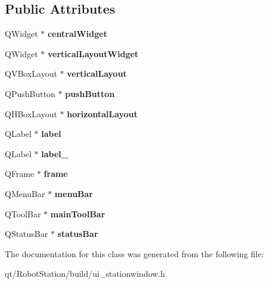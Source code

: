 \subsection*{Public Attributes}
\begin{DoxyCompactItemize}
\item 
\hypertarget{classUi__StationWindow_a29ad623f922ab7ede612f9dddab7a55c}{}Q\+Widget $\ast$ {\bfseries central\+Widget}\label{classUi__StationWindow_a29ad623f922ab7ede612f9dddab7a55c}

\item 
\hypertarget{classUi__StationWindow_a781611f8784156ed093f55133a25a8fe}{}Q\+Widget $\ast$ {\bfseries vertical\+Layout\+Widget}\label{classUi__StationWindow_a781611f8784156ed093f55133a25a8fe}

\item 
\hypertarget{classUi__StationWindow_a7993a098ec601f40393fcafd8cfa619e}{}Q\+V\+Box\+Layout $\ast$ {\bfseries vertical\+Layout}\label{classUi__StationWindow_a7993a098ec601f40393fcafd8cfa619e}

\item 
\hypertarget{classUi__StationWindow_ad015d1543bc1ca34a00d7a0972703fed}{}Q\+Push\+Button $\ast$ {\bfseries push\+Button}\label{classUi__StationWindow_ad015d1543bc1ca34a00d7a0972703fed}

\item 
\hypertarget{classUi__StationWindow_acd4d97d889710071df46b388cc41a59b}{}Q\+H\+Box\+Layout $\ast$ {\bfseries horizontal\+Layout}\label{classUi__StationWindow_acd4d97d889710071df46b388cc41a59b}

\item 
\hypertarget{classUi__StationWindow_a2c1e1c0a89df30ddceadcdbc336220e3}{}Q\+Label $\ast$ {\bfseries label}\label{classUi__StationWindow_a2c1e1c0a89df30ddceadcdbc336220e3}

\item 
\hypertarget{classUi__StationWindow_a69ba5662bd433c7ea4517e855f98ceef}{}Q\+Label $\ast$ {\bfseries label\+\_}\label{classUi__StationWindow_a69ba5662bd433c7ea4517e855f98ceef}

\item 
\hypertarget{classUi__StationWindow_a26d848d23a49c55f53cb002c14bc4a6d}{}Q\+Frame $\ast$ {\bfseries frame}\label{classUi__StationWindow_a26d848d23a49c55f53cb002c14bc4a6d}

\item 
\hypertarget{classUi__StationWindow_a55e779c5080b58d5d184e62f940bebb5}{}Q\+Menu\+Bar $\ast$ {\bfseries menu\+Bar}\label{classUi__StationWindow_a55e779c5080b58d5d184e62f940bebb5}

\item 
\hypertarget{classUi__StationWindow_a42668dfd765d1f0530f5ea338a6777fd}{}Q\+Tool\+Bar $\ast$ {\bfseries main\+Tool\+Bar}\label{classUi__StationWindow_a42668dfd765d1f0530f5ea338a6777fd}

\item 
\hypertarget{classUi__StationWindow_afbc2e6b70ab385a9a163bfc80ef49299}{}Q\+Status\+Bar $\ast$ {\bfseries status\+Bar}\label{classUi__StationWindow_afbc2e6b70ab385a9a163bfc80ef49299}

\end{DoxyCompactItemize}


The documentation for this class was generated from the following file\+:\begin{DoxyCompactItemize}
\item 
qt/\+Robot\+Station/build/ui\+\_\+stationwindow.\+h\end{DoxyCompactItemize}
